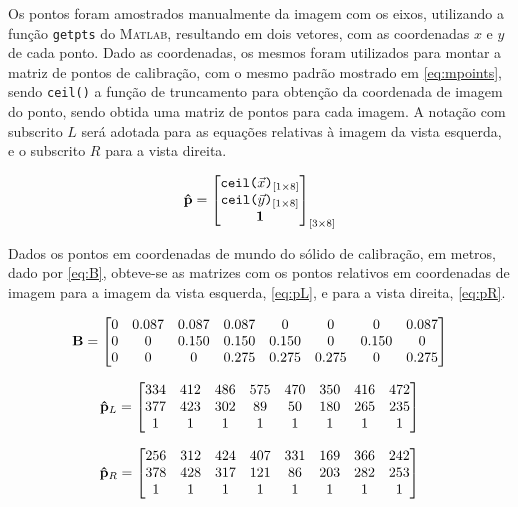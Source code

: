 Os pontos foram amostrados manualmente da imagem com os eixos, utilizando a função \texttt{getpts} do \textsc{Matlab}, resultando em dois vetores, com as coordenadas $x$ e $y$ de cada ponto. Dado as coordenadas, os mesmos foram utilizados para montar a matriz de pontos de calibração, com o mesmo padrão mostrado em \eqref{eq:mpoints}, sendo \texttt{ceil()} a função de truncamento para obtenção da coordenada de imagem do ponto, sendo obtida uma matriz de pontos para cada imagem. A notação com subscrito $L$ será adotada para as equações relativas à imagem da vista esquerda, e o subscrito $R$ para a vista direita.

\begin{equation}\label{eq:mpoints}
	\mathbf{\hat{p}} = \begin{bmatrix}
		\texttt{ceil(}\vec{x}\texttt{)}_{[1 \times 8]} \\
		\texttt{ceil(}\vec{y}\texttt{)}_{[1 \times 8]} \\
		\mathbf{1}
	\end{bmatrix}_{[3 \times 8]}
\end{equation}

Dados os pontos em coordenadas de mundo do sólido de calibração, em metros, dado por \eqref{eq:B}, obteve-se as matrizes com os pontos relativos em coordenadas de imagem para a imagem da vista esquerda, \eqref{eq:pL}, e para a vista direita, \eqref{eq:pR}.

\begin{equation} \label{eq:B}
	\mathbf{B} = \begin{bmatrix}
			0 & 0.087 & 0.087 & 0.087 & 0     & 0     & 0     & 0.087 \\
			0 & 0     & 0.150 & 0.150 & 0.150 & 0     & 0.150 & 0     \\
			0 & 0     & 0     & 0.275 & 0.275 & 0.275 & 0     & 0.275
	\end{bmatrix}
\end{equation}

\begin{equation} \label{eq:pL}
	\mathbf{\hat{p}}_L = \begin{bmatrix}
		334 & 412 & 486 & 575 & 470 & 350 & 416 & 472 \\
		377 & 423 & 302 & 89  & 50  & 180 & 265 & 235 \\
		1   & 1   & 1   & 1   & 1   & 1   & 1   & 1  
	\end{bmatrix}
\end{equation}

\begin{equation} \label{eq:pR}
	\mathbf{\hat{p}}_R = \begin{bmatrix}
		256 & 312 & 424 & 407 & 331 & 169 & 366 & 242 \\
		378 & 428 & 317 & 121 & 86  & 203 & 282 & 253 \\
		1   & 1   & 1   & 1   & 1   & 1   & 1   & 1 
	\end{bmatrix}
\end{equation}

